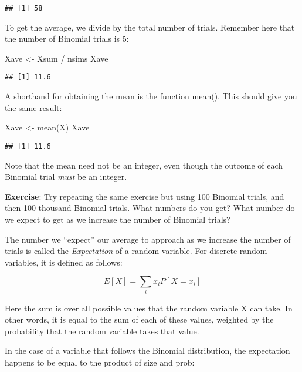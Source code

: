\documentclass[
]{book}
\newenvironment{Shaded}{\begin{snugshade}}{\end{snugshade}}
\newcommand{\FunctionTok}[1]{\textcolor[rgb]{0.00,0.00,0.00}{#1}}
\newcommand{\NormalTok}[1]{#1}
\newcommand{\OtherTok}[1]{\textcolor[rgb]{0.56,0.35,0.01}{#1}}
\newcommand{\SpecialCharTok}[1]{\textcolor[rgb]{0.00,0.00,0.00}{#1}}
\begin{document}
\begin{verbatim}
## [1] 58
\end{verbatim}

To get the average, we divide by the total number of trials. Remember here that the number of Binomial trials is 5:

\begin{Shaded}
\begin{Highlighting}[]
\NormalTok{Xave }\OtherTok{\textless{}{-}}\NormalTok{ Xsum }\SpecialCharTok{/}\NormalTok{ nsims}
\NormalTok{Xave}
\end{Highlighting}
\end{Shaded}

\begin{verbatim}
## [1] 11.6
\end{verbatim}

A shorthand for obtaining the mean is the function mean(). This should give you the same result:

\begin{Shaded}
\begin{Highlighting}[]
\NormalTok{Xave }\OtherTok{\textless{}{-}} \FunctionTok{mean}\NormalTok{(X)}
\NormalTok{Xave}
\end{Highlighting}
\end{Shaded}

\begin{verbatim}
## [1] 11.6
\end{verbatim}

Note that the mean need not be an integer, even though the outcome of each Binomial trial \emph{must} be an integer.

\textbf{Exercise}: Try repeating the same exercise but using 100 Binomial trials, and then 100 thousand Binomial trials. What numbers do you get? What number do we expect to get as we increase the number of Binomial trials?

The number we ``expect'' our average to approach as we increase the number of trials is called the \emph{Expectation} of a random variable. For discrete random variables, it is defined as follows:

\[E[X] = \sum_{i}x_iP[X=x_i]\]

Here the sum is over all possible values that the random variable X can take. In other words, it is equal to the sum of each of these values, weighted by the probability that the random variable takes that value.

In the case of a variable that follows the Binomial distribution, the expectation happens to be equal to the product of size and prob:
\end{document}
